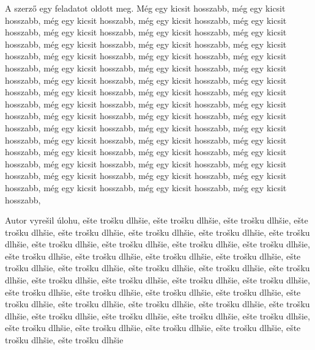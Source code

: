\documentclass[a4paper,oneside,onecolumn,12pt]{LegrandOrangeBook}
\begin{document}

A szerző egy feladatot oldott meg. Még egy kicsit hosszabb, még egy kicsit hosszabb, még egy kicsit hosszabb, még egy kicsit hosszabb, még egy kicsit hosszabb, még egy kicsit hosszabb, még egy kicsit hosszabb, még egy kicsit hosszabb, még egy kicsit hosszabb, még egy kicsit hosszabb, még egy kicsit hosszabb, még egy kicsit hosszabb, még egy kicsit hosszabb, még egy kicsit hosszabb, még egy kicsit hosszabb, még egy kicsit hosszabb, még egy kicsit hosszabb, még egy kicsit hosszabb, még egy kicsit hosszabb, még egy kicsit hosszabb, még egy kicsit hosszabb, még egy kicsit hosszabb, még egy kicsit hosszabb, még egy kicsit hosszabb, még egy kicsit hosszabb, még egy kicsit hosszabb, még egy kicsit hosszabb, még egy kicsit hosszabb, még egy kicsit hosszabb, még egy kicsit hosszabb, még egy kicsit hosszabb, még egy kicsit hosszabb, még egy kicsit hosszabb, még egy kicsit hosszabb, még egy kicsit hosszabb, még egy kicsit hosszabb, még egy kicsit hosszabb, még egy kicsit hosszabb, még egy kicsit hosszabb, még egy kicsit hosszabb, még egy kicsit hosszabb, még egy kicsit hosszabb, még egy kicsit hosszabb, még egy kicsit hosszabb, még egy kicsit hosszabb, még egy kicsit hosszabb, még egy kicsit hosszabb,  


Autor vyrešil úlohu, ešte trošku dlhšie, ešte trošku dlhšie, ešte trošku dlhšie, ešte trošku dlhšie, ešte trošku dlhšie, ešte trošku dlhšie, ešte trošku dlhšie, ešte trošku dlhšie, ešte trošku dlhšie, ešte trošku dlhšie, ešte trošku dlhšie, ešte trošku dlhšie, ešte trošku dlhšie, ešte trošku dlhšie, ešte trošku dlhšie, ešte trošku dlhšie, ešte trošku dlhšie, ešte trošku dlhšie, ešte trošku dlhšie, ešte trošku dlhšie, ešte trošku dlhšie, ešte trošku dlhšie, ešte trošku dlhšie, ešte trošku dlhšie, ešte trošku dlhšie, ešte trošku dlhšie, ešte trošku dlhšie, ešte trošku dlhšie, ešte trošku dlhšie, ešte trošku dlhšie, ešte trošku dlhšie, ešte trošku dlhšie, ešte trošku dlhšie, ešte trošku dlhšie, ešte trošku dlhšie, ešte trošku dlhšie, ešte trošku dlhšie, ešte trošku dlhšie, ešte trošku dlhšie, ešte trošku dlhšie, ešte trošku dlhšie, ešte trošku dlhšie, ešte trošku dlhšie, ešte trošku dlhšie
\pagebreak

\label{sec:abstrakt}
\end{document}
